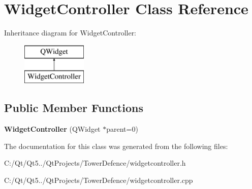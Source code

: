 \hypertarget{class_widget_controller}{}\section{Widget\+Controller Class Reference}
\label{class_widget_controller}
Inheritance diagram for Widget\+Controller\+:\begin{figure}[H]
\begin{center}
\leavevmode
\includegraphics[height=2.000000cm]{class_widget_controller}
\end{center}
\end{figure}
\subsection*{Public Member Functions}
\begin{DoxyCompactItemize}
\item 
\hypertarget{class_widget_controller_a3af6b104b67e6710208d5d26f918fc00}{}{\bfseries Widget\+Controller} (Q\+Widget $\ast$parent=0)\label{class_widget_controller_a3af6b104b67e6710208d5d26f918fc00}

\end{DoxyCompactItemize}


The documentation for this class was generated from the following files\+:\begin{DoxyCompactItemize}
\item 
C\+:/\+Qt/\+Qt5../\+Qt\+Projects/\+Tower\+Defence/widgetcontroller.\+h\item 
C\+:/\+Qt/\+Qt5../\+Qt\+Projects/\+Tower\+Defence/widgetcontroller.\+cpp\end{DoxyCompactItemize}
